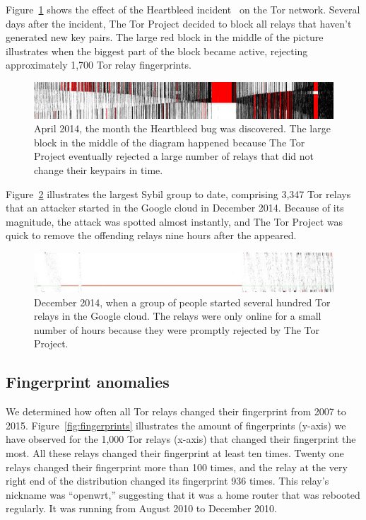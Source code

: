 Figure~\ref{fig:2014-04-heartbleed} shows the effect of the Heartbleed
incident~\cite{Durumeric2014a} on the Tor network.  Several days after the
incident, The Tor Project decided to block all relays that haven't generated new
key pairs.  The large red block in the middle of the picture illustrates when
the biggest part of the block became active, rejecting approximately 1,700 Tor
relay fingerprints.

\begin{figure}[t]
	\centering
	\includegraphics[width=\linewidth]{diagrams/heartbleed-uptimes.jpg}
	\caption{April 2014, the month the Heartbleed bug was discovered.
		The large block in the middle of the diagram happened because The
		Tor Project eventually rejected a large number of relays that did not
		change their keypairs in time.}
		\label{fig:2014-04-heartbleed}
\end{figure}

Figure~\ref{fig:2014-12-lizard} illustrates the largest Sybil group to date,
comprising 3,347 Tor relays that an attacker started in the Google cloud in
December 2014.  Because of its magnitude, the attack was spotted almost
instantly, and The Tor Project was quick to remove the offending relays nine
hours after the appeared.

\begin{figure}[t]
	\centering
	\includegraphics[width=\linewidth]{diagrams/lizard-uptimes.jpg}
	\caption{December 2014, when a group of people started several hundred Tor
	relays in the Google cloud.  The relays were only online for a small number
	of hours because they were promptly rejected by The Tor Project.}
	\label{fig:2014-12-lizard}
\end{figure}

\subsection{Fingerprint anomalies}
\label{sec:fingerprint-anomalies}
We determined how often all Tor relays changed their fingerprint from 2007 to
2015.  Figure~\ref{fig:fingerprints} illustrates the amount of fingerprints
(y-axis) we have observed for the 1,000 Tor relays (x-axis) that changed their
fingerprint the most.  All these relays changed their fingerprint at least ten
times.  Twenty one relays changed their fingerprint more than 100 times, and the
relay at the very right end of the distribution changed its fingerprint 936
times.  This relay's nickname was ``openwrt,'' suggesting that it was a home
router that was rebooted regularly.  It was running from August 2010 to December
2010.

